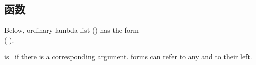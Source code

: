 \subsection{函数}
\label{section:函数}

\begin{flushleft}
  Below, ordinary lambda list () has the form\\
  (
  ).
\end{flushleft}
   is \T\ if there is a corresponding
  argument.  forms can refer to any  and
   to their left.

